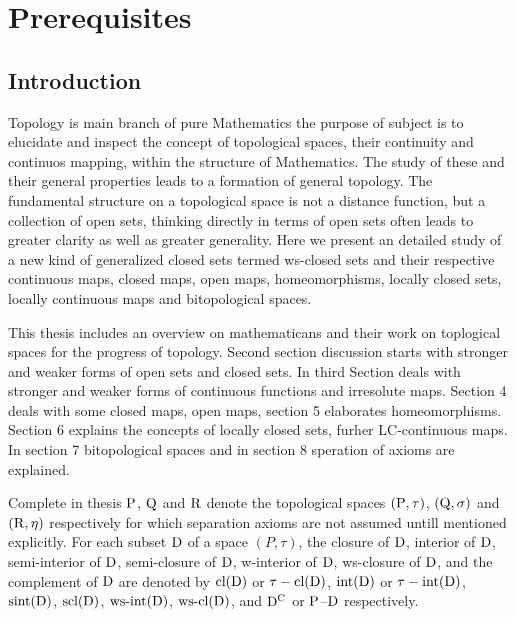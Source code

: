 \chapter{Prerequisites}
\graphicspath{{Chapter1/Chapter1Figs/EPS/}{Chapter1/Chapter1Figs/}}

\section{Introduction}

Topology is main branch of pure Mathematics the purpose of subject is to elucidate and inspect the concept of topological spaces, their continuity and continuos mapping, within the structure of Mathematics. The study of these and their general properties leads to a formation of general topology. The fundamental structure on a topological space is not a distance function, but a collection of open sets, thinking directly in terms of open sets often leads to greater clarity as well as greater generality. Here we present an detailed study of a new kind of generalized closed sets termed ws-closed sets and their respective continuous maps, closed maps, open maps, homeomorphisms, locally closed sets, locally continuous maps and bitopological spaces.

This thesis includes an overview on mathematicans and their work on toplogical spaces for the progress of topology. Second section discussion starts with stronger and weaker forms of open sets and closed sets. In third Section deals with stronger and weaker forms of continuous functions and irresolute maps. Section 4 deals with some closed maps, open maps, section 5 elaborates homeomorphisms. Section 6 explains the concepts of locally closed sets, furher LC-continuous maps. In section 7 bitopological spaces and in section 8 speration of axioms are explained.

Complete in thesis $\mathrm{P}$, $\mathrm{Q}$ and $\mathrm{R}$ denote the topological spaces $(\mathrm{P},\tau)$, $(\mathrm{Q},\sigma)$ and $(\mathrm{R}, \eta)$ respectively for which separation axioms are not assumed untill mentioned explicitly. For each subset $\mathrm{D}$ of a space $(P, \tau)$, the closure of $\mathrm{D}$, interior of $\mathrm{D}$, semi-interior of $\mathrm{D}$, semi-closure of $\mathrm{D}$, w-interior of $\mathrm{D}$, ws-closure of $\mathrm{D}$, and the complement of $\mathrm{D}$ are denoted by $\mbox{cl}(\mathrm{D})$ or $\tau-\mbox{cl}(\mathrm{D})$, $\mbox{int}(\mathrm{D})$ or $\tau-\mbox{int}(\mathrm{D})$, $\mbox{sint}(\mathrm{D})$, $\mbox{scl}(\mathrm{D})$, $\mbox{ws-int}(\mathrm{D})$, $\mbox{ws-cl}(\mathrm{D})$, and $\mathrm{D}^{\text{C}}$ or $\mathrm{P}$--$\mathrm{D}$ respectively.

